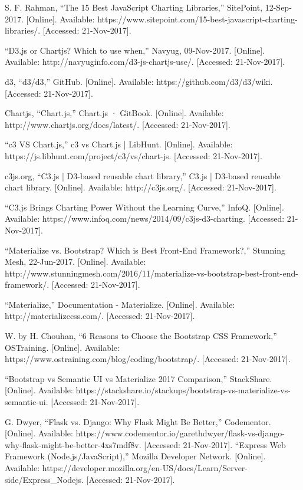 \documentclass[onecolumn, draftclsnofoot,10pt, compsoc]{IEEEtran}
\begin{document}
\begin{thebibliography}{9}
S. F. Rahman, “The 15 Best JavaScript Charting Libraries,” SitePoint, 12-Sep-2017. [Online]. Available: https://www.sitepoint.com/15-best-javascript-charting-libraries/. [Accessed: 21-Nov-2017].

“D3.js or Chartjs? Which to use when,” Navyug, 09-Nov-2017. [Online]. Available: http://navyuginfo.com/d3-js-chartjs-use/. [Accessed: 21-Nov-2017].

d3, “d3/d3,” GitHub. [Online]. Available: https://github.com/d3/d3/wiki. [Accessed: 21-Nov-2017].

Chartjs, “Chart.js,” Chart.js · GitBook. [Online]. Available: http://www.chartjs.org/docs/latest/. [Accessed: 21-Nov-2017].


“c3 VS Chart.js,” c3 vs Chart.js | LibHunt. [Online]. Available: https://js.libhunt.com/project/c3/vs/chart-js. [Accessed: 21-Nov-2017].

c3js.org, “C3.js | D3-based reusable chart library,” C3.js | D3-based reusable chart library. [Online]. Available: http://c3js.org/. [Accessed: 21-Nov-2017].

“C3.js Brings Charting Power Without the Learning Curve,” InfoQ. [Online]. Available: https://www.infoq.com/news/2014/09/c3js-d3-charting. [Accessed: 21-Nov-2017].

“Materialize vs. Bootstrap? Which is Best Front-End Framework?,” Stunning Mesh, 22-Jun-2017. [Online]. Available: http://www.stunningmesh.com/2016/11/materialize-vs-bootstrap-best-front-end-framework/. [Accessed: 21-Nov-2017].

“Materialize,” Documentation - Materialize. [Online]. Available: http://materializecss.com/. [Accessed: 21-Nov-2017].

W. by H. Chouhan, “6 Reasons to Choose the Bootstrap CSS Framework,” OSTraining. [Online]. Available: https://www.ostraining.com/blog/coding/bootstrap/. [Accessed: 21-Nov-2017].

“Bootstrap vs Semantic UI vs Materialize 2017 Comparison,” StackShare. [Online]. Available: https://stackshare.io/stackups/bootstrap-vs-materialize-vs-semantic-ui. [Accessed: 21-Nov-2017].

G. Dwyer, “Flask vs. Django: Why Flask Might Be Better,” Codementor. [Online]. Available: https://www.codementor.io/garethdwyer/flask-vs-django-why-flask-might-be-better-4xs7mdf8v. [Accessed: 21-Nov-2017].
“Express Web Framework (Node.js/JavaScript),” Mozilla Developer Network. [Online]. Available: https://developer.mozilla.org/en-US/docs/Learn/Server-side/Express\_Nodejs. [Accessed: 21-Nov-2017].



\end{thebibliography}
\end{document}
